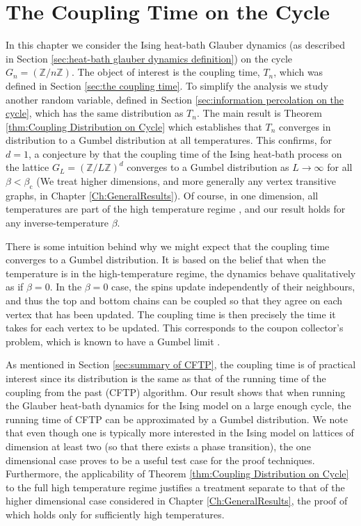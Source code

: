 \chapter{The Coupling Time on the Cycle}
\label{Ch:1D}


	In this chapter we consider the Ising heat-bath Glauber dynamics (as described in Section \ref{sec:heat-bath glauber dynamics definition}) on the cycle $G_n = (\mathbb{Z}/n\mathbb{Z})$. The object of interest is the coupling time, $T_n$, which was defined in Section \ref{sec:the coupling time}. To simplify the analysis we study another random variable, defined in Section \ref{sec:information percolation on the cycle}, which has the same distribution as $T_n$. The main result is Theorem \ref{thm:Coupling Distribution on Cycle} which establishes that $T_n$ converges in distribution to a Gumbel distribution at all temperatures. This confirms, for $d = 1$, a conjecture by \citeauthor{Collevecchio2018-nq} that the coupling time of the Ising heat-bath process on the lattice $G_L = (\mathbb{Z}/L\mathbb{Z})^d$ converges to a Gumbel distribution as $L \rightarrow \infty$ for all $\beta < \beta_\mathrm{c}$ \cite[Conjecture 7.1]{Collevecchio2018-nq} (We treat higher dimensions, and more generally any vertex transitive graphs, in Chapter \ref{Ch:GeneralResults}). Of course, in one dimension, all temperatures are part of the high temperature regime \cite{Friedli2017-xm}, and our result holds for any inverse-temperature $\beta$.

	There is some intuition behind why we might expect that the coupling time converges to a Gumbel distribution. It is based on the belief that when the temperature is in the high-temperature regime, the dynamics behave qualitatively as if $\beta = 0$. In the $\beta = 0$ case, the spins update independently of their neighbours, and thus the top and bottom chains can be coupled so that they agree on each vertex that has been updated. The coupling time is then precisely the time it takes for each vertex to be updated. This corresponds to the coupon collector's problem, which is known to have a Gumbel limit \cite{Erdos1961-ti}.

	As mentioned in Section \ref{sec:summary of CFTP}, the coupling time is of practical interest since its distribution is the same as that of the running time of the coupling from the past (CFTP) algorithm. Our result shows that when running the Glauber heat-bath dynamics for the Ising model on a large enough cycle, the running time of CFTP can be approximated by a Gumbel distribution. We note that even though one is typically more interested in the Ising model on lattices of dimension at least two (so that there exists a phase transition), the one dimensional case proves to be a useful test case for the proof techniques. Furthermore, the applicability of Theorem \ref{thm:Coupling Distribution on Cycle} to the full high temperature regime justifies a treatment separate to that of the higher dimensional case considered in Chapter \ref{Ch:GeneralResults}, the proof of which holds only for sufficiently high temperatures.


